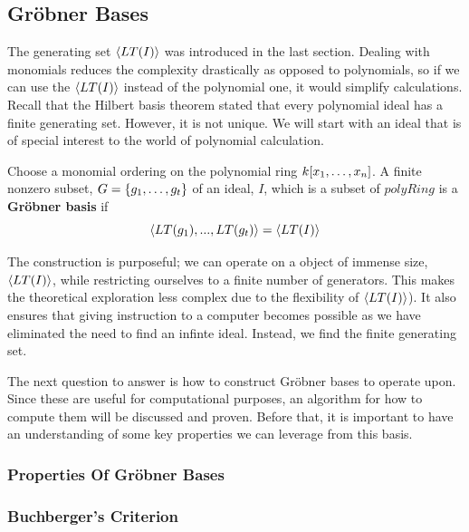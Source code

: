 
\subsection{Gröbner Bases} 
\label{ssec:grobner-basis}
The generating set $\langle LT(I) \rangle$ was introduced in the last section. Dealing with monomials reduces the complexity drastically as opposed to polynomials, so if we can use the $\langle LT(I) \rangle$ instead of the polynomial one, it would simplify calculations. Recall that the Hilbert basis theorem stated that every polynomial ideal has a finite generating set. However, it is not unique. We will start with an ideal that is of special interest to the world of polynomial calculation.

\begin{definition}
    Choose a monomial ordering on the polynomial ring $k\lbrack x_1, \dots, x_n \rbrack$. A finite nonzero subset, $G = \lbrace g_1, \dots, g_t \rbrace $ of an ideal, $I$, which is a subset of $polyRing$ is a \textbf{Gröbner basis} if 
    \begin{equation}
        \langle LT(g_1), ... , LT(g_t) \rangle = \langle LT(I) \rangle
    \end{equation}
\end{definition}

The construction is purposeful; we can operate on a object of immense size, $\langle LT(I) \rangle$, while restricting ourselves to a finite number of generators. This makes the theoretical exploration less complex due to the flexibility of $\langle LT(I) \rangle$). It also ensures that giving instruction to a computer becomes possible as we have eliminated the need to find an infinte ideal. Instead, we find the finite generating set. 

The next question to answer is how to construct Gröbner bases to operate upon. Since these are useful for computational purposes, an algorithm for how to compute them will be discussed and proven. Before that, it is important to have an understanding of some key properties we can leverage from this basis.

\subsubsection{Properties Of Gröbner Bases}
\label{sssec:properties-of-grobner-basis}

\subsubsection{Buchberger's Criterion}
\label{sssec:buchbergers-criterion}
